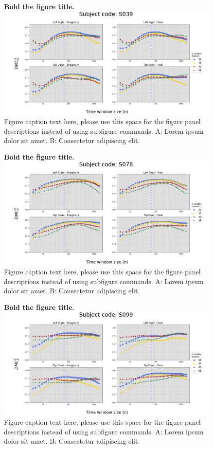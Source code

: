 \documentclass[10pt,letterpaper]{article}
\begin{document}
  \begin{figure}[!h]
    \caption{{\bf Bold the figure title.}
    \includegraphics[width=.9\textwidth]{../output/figs/stats/S039.jpg}
    Figure caption text here, please use this space for the figure panel descriptions instead of using subfigure commands. A: Lorem ipsum dolor sit amet. B: Consectetur adipiscing elit.}
    \label{fig39}
    \end{figure}

  \begin{figure}[!h]
    \caption{{\bf Bold the figure title.}
    \includegraphics[width=.9\textwidth]{../output/figs/stats/S078.jpg}
      Figure caption text here, please use this space for the figure panel descriptions instead of using subfigure commands. A: Lorem ipsum dolor sit amet. B: Consectetur adipiscing elit.}
    \label{fig78}
    \end{figure}

  \begin{figure}[!h]
    \caption{{\bf Bold the figure title.}
    \includegraphics[width=.9\textwidth]{../output/figs/stats/S099.jpg}
      Figure caption text here, please use this space for the figure panel descriptions instead of using subfigure commands. A: Lorem ipsum dolor sit amet. B: Consectetur adipiscing elit.}
    \label{fig99}
    \end{figure}
\end{document}
